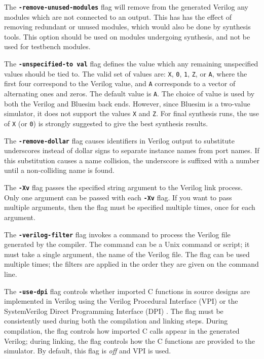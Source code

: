 \documentclass{article}
\begin{document}
The {\bf\tt -remove-unused-modules} flag will remove from the generated
Verilog any modules which are not connected to an
output.  This has has the effect of removing redundant or unused
modules, which would also be done by synthesis tools.   This option
should be used on modules undergoing synthesis, and not be used for
testbench modules.

The {\bf\tt -unspecified-to val} flag defines the value
which any remaining unspecified values should be tied to.  The valid
set of values are: {\tt X}, {\tt 0}, {\tt 1}, {\tt Z}, or {\tt A},
where the first four correspond to the Verilog value, and {\tt A}
corresponds to a vector of alternating ones and zeros.
The default value is {\tt A}.  The choice of value is used by both
the Verilog and Bluesim back ends.  However, since Bluesim is a two-value
simulator, it does not support the values {\tt X} and {\tt Z}.
For final synthesis runs, the use of {\tt X} (or {\tt 0})
is strongly suggested to give the best synthesis results.

The {\bf\tt -remove-dollar} flag causes identifiers in Verilog output
to substitute underscores instead of dollar signs to separate instance
names from port names.  If this substitution causes a name collision,
the underscore is suffixed with a number until a non-colliding name is
found.

The {\bf\tt -Xv} flag passes the specified string argument to the Verilog link
process.   Only one argument can be passed with each {\bf\tt -Xv}
flag. If you want to pass multiple arguments, then the flag must be
specified multiple times, once for each argument.

The {\bf\tt -verilog-filter} flag invokes a command to process the
 Verilog file generated by the compiler.  The command can be a Unix
 command or script;
it must take a single argument, the name of the Verilog file.    The
 flag can be used multiple times; the filters are applied in the order
 they are given on the command line.

The {\bf\tt -use-dpi} flag controls whether imported C functions in
source designs are implemented in Verilog using
the Verilog Procedural Interface (VPI)
or the SystemVerilog Direct Programming Interface (DPI)
.
The flag must be consistently used during both the compilation and
linking steps.
During compilation, the flag controls how imported C calls appear
in the generated Verilog;
during linking, the flag controls how the C functions are provided
to the simulator.
By default, this flag is \emph{off} and VPI is used.
\end{document}
